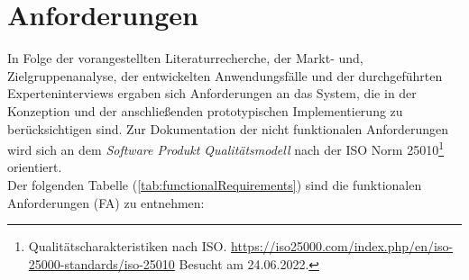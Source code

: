 \section{Anforderungen}
\label{sec:requirementsFinal}
    In Folge der vorangestellten Literaturrecherche, der Markt- und, Zielgruppenanalyse, der entwickelten Anwendungsfälle und 
    der durchgeführten Experteninterviews ergaben sich Anforderungen an das System, 
    die in der Konzeption und der anschließenden prototypischen Implementierung zu berücksichtigen sind. 
    Zur Dokumentation der nicht funktionalen Anforderungen wird sich an dem 
    \textit{Software Produkt Qualitätsmodell} nach der ISO Norm 25010\footnote{Qualitätscharakteristiken nach ISO. \url{https://iso25000.com/index.php/en/iso-25000-standards/iso-25010} Besucht am 24.06.2022.} 
    orientiert. 
    \\
    Der folgenden Tabelle (\ref{tab:functionalRequirements}) sind die funktionalen Anforderungen (FA) zu entnehmen: 
